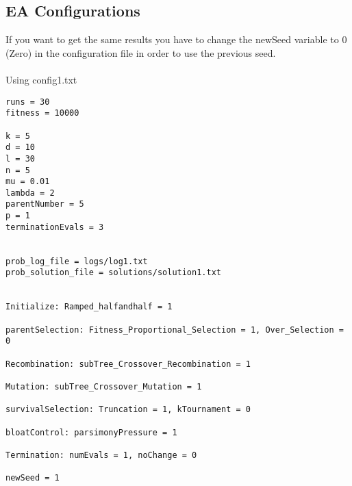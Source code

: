 \documentclass[•]{article}
\begin{document}
\pagebreak
\subsection{EA Configurations}
If you want to get the same results you have to change the newSeed variable to 0 (Zero) in the configuration file in order to use the previous seed.\\\\

Using config1.txt 
\begin{lstlisting}
runs = 30
fitness = 10000

k = 5
d = 10
l = 30
n = 5
mu = 0.01
lambda = 2
parentNumber = 5
p = 1
terminationEvals = 3


prob_log_file = logs/log1.txt
prob_solution_file = solutions/solution1.txt


Initialize: Ramped_halfandhalf = 1

parentSelection: Fitness_Proportional_Selection = 1, Over_Selection = 0

Recombination: subTree_Crossover_Recombination = 1

Mutation: subTree_Crossover_Mutation = 1

survivalSelection: Truncation = 1, kTournament = 0

bloatControl: parsimonyPressure = 1

Termination: numEvals = 1, noChange = 0

newSeed = 1
\end{lstlisting}
\end{document}
